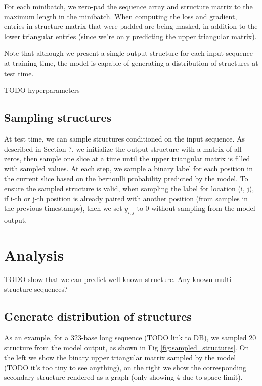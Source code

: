 \documentclass{article}
\begin{document}
For each minibatch, we zero-pad the sequence array and structure matrix to the maximum length in the minibatch.
When computing the loss and gradient, entries in structure matrix that were padded are being masked,
in addition to the lower triangular entries (since we're only predicting the upper triangular matrix).

Note that although we present a single output structure for each input sequence at training time,
the model is capable of generating a distribution of structures at test time.

TODO hyperparameters





\subsection{Sampling structures}

At test time, we can sample structures conditioned on the input sequence.
As described in Section ?, we initialize the output structure with a matrix of all zeros,
then sample one slice at a time until the upper triangular matrix is filled with sampled values.
At each step, we sample a binary label for each position in the current slice based on the
bernoulli probability predicted by the model.
To ensure the sampled structure is valid, when sampling the label for location (i, j),
if i-th or j-th position is already paired with another position (from samples in the previous timestamps),
then we set $y_{i, j}$ to $0$ without sampling from the model output.

\section{Analysis}

TODO show that we can predict well-known structure.
Any known multi-structure sequences?

\subsection{Generate distribution of structures}

As an example, for a 323-base long sequence (TODO link to DB),
we sampled 20 structure from the model output, as shown in Fig \ref{fig:sampled_structures}.
On the left we show the binary upper triangular matrix sampled by the model (TODO it's too tiny to see anything),
on the right we show the corresponding secondary structure rendered as a graph (only showing 4 due to space limit).
\end{document}

